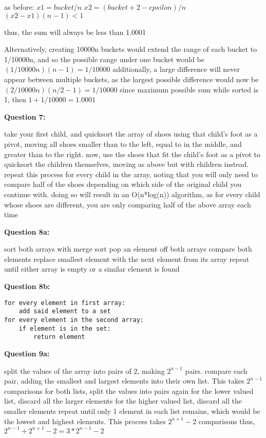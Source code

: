 \documentclass{article}
\begin{document}
as before:
\(x1 = bucket / n\)
\(x2 = (bucket + 2 - epsilon) / n\)
\((x2 - x1)(n-1) < 1\)

thus, the sum will always be less than 1.0001

Alternatively, creating 10000n buckets would extend the range of each bucket to 1/10000n, and so the possible range under one bucket would be
\((1/10000n)(n-1) = 1/10000\)
additionally, a large difference will never appear between multiple buckets, as the largest possible difference would now be
\((2/10000n)(n/2-1) = 1/10000\)
since maximum possible sum while sorted is 1, then \(1 + 1/10000 = 1.0001\)

\textbf{Question 7:}

take your first child, and quicksort the array of shoes using that child's foot as a pivot, moving all shoes smaller than to the left, equal to in the middle, and greater than to the right.
now, use the shoes that fit the child's foot as a pivot to quicksort the children themselves, moving as above but with children instead.
repeat this process for every child in the array, noting that you will only need to compare half of the shoes depending on which side of the original child you continue with.
doing so will result in an O(n*log(n)) algorithm, as for every child whose shoes are different, you are only comparing half of the above array each time

\textbf{Question 8a:}

sort both arrays with merge sort
pop an element off both arrays
compare both elements
replace smallest element with the next element from its array
repeat until either array is empty or a similar element is found

\textbf{Question 8b:}

\begin{verbatim}
for every element in first array:
    add said element to a set
for every element in the second array:
    if element is in the set:
        return element
\end{verbatim}

\textbf{Question 9a:}

split the values of the array into pairs of 2, making \(2^{n-1}\) pairs.
compare each pair, adding the smallest and largest elements into their own list. This takes \(2^{n-1}\) comparisons
for both lists, split the values into pairs again
    for the lower valued list, discard all the larger elements
    for the higher valued list, discard all the smaller elements
repeat until only 1 element in each list remains, which would be the lowest and highest elements.
This process takes \(2^{n+1} - 2\) comparisons
thus,
\(2^{n-1} + 2^{n+1} - 2 = 3*2^{n-1} - 2\)
\end{document}
